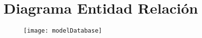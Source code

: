 \chapter{Diagrama Entidad Relación}

\begin{figure}[ht]
	\centering
	\texttt{[image: modelDatabase]}
\end{figure}